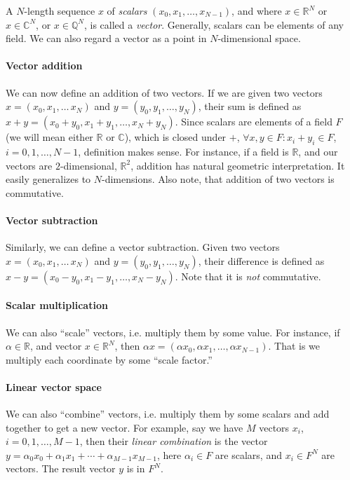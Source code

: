 \documentclass[10pt]{article}
\begin{document}
A $N$-length sequence $x$ of {\it scalars} $(x_0, x_1, \ldots, x_{N-1})$, and
where $x \in \mathbb{R}^N$ or $x \in \mathbb{C}^N$, or $x \in \mathbb{Q}^N$, is
called a {\it vector}. Generally, scalars can be elements of any field. We can
also regard a vector as a point in $N$-dimensional space.

\paragraph{Vector addition} We can now define an addition of two vectors. If we
are given two vectors $x=(x_0, x_1,\ldots\,x_N)$ and $y=(y_0, y_1,
\ldots,y_N)$, their sum is defined as $x+y=(x_0+y_0,x_1+y_1,\ldots,x_N+y_N)$.
Since scalars are elements of a field $F$ (we will mean either
$\mathbb{R}$ or $\mathbb{C}$), which is closed under $+$, $\forall x, y \in F:
x_i+y_i \in F$, $i=0,1,\ldots,N-1$, definition makes sense. For instance, if a
field is $\mathbb{R}$, and our vectors are $2$-dimensional, $\mathbb{R}^2$,
addition has natural geometric interpretation. It easily generalizes to
$N$-dimensions. Also note, that addition of two vectors is commutative.

\paragraph{Vector subtraction} Similarly, we can define a vector subtraction.
Given two vectors $x=(x_0, x_1,\ldots\,x_N)$ and $y=(y_0, y_1, \ldots,y_N)$,
their difference is defined as $x-y=(x_0-y_0,x_1-y_1,\ldots,x_N-y_N)$. Note
that it is {\sl not} commutative.

\paragraph{Scalar multiplication} We can also ``scale'' vectors, i.e. multiply
them by some value. For instance, if $\alpha \in \mathbb{R}$, and vector $x \in
\mathbb{R}^N$, then $\alpha x = (\alpha x_0, \alpha x_1, \ldots, \alpha
x_{N-1})$. That is we multiply each coordinate by some ``scale factor.''

\paragraph{Linear vector space} We can also ``combine'' vectors, i.e. multiply
them by some scalars and add together to get a new vector. For example, say we
have $M$ vectors $x_i$, $i=0,1,\ldots,M-1$, then their {\it linear combination}
is the vector $y=\alpha_0 x_0 + \alpha_1 x_1 + \cdots + \alpha_{M-1}x_{M-1}$,
here $\alpha_i \in F$ are scalars, and $x_i \in F^N$ are vectors. The result
vector $y$ is in $F^N$.
\end{document}
